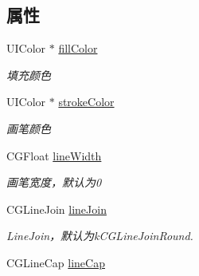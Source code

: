 \subsection*{属性}
\begin{DoxyCompactItemize}
\item 
\hypertarget{interface_b_m_k_overlay_path_view_a955c1cfe9de3338eccbde829a6651d07}{U\+I\+Color $\ast$ \hyperlink{interface_b_m_k_overlay_path_view_a955c1cfe9de3338eccbde829a6651d07}{fill\+Color}}\label{interface_b_m_k_overlay_path_view_a955c1cfe9de3338eccbde829a6651d07}

\begin{DoxyCompactList}\small\item\em 填充颜色 \end{DoxyCompactList}\item 
\hypertarget{interface_b_m_k_overlay_path_view_a5fe2c3236a16a520f9f867bd34dac08e}{U\+I\+Color $\ast$ \hyperlink{interface_b_m_k_overlay_path_view_a5fe2c3236a16a520f9f867bd34dac08e}{stroke\+Color}}\label{interface_b_m_k_overlay_path_view_a5fe2c3236a16a520f9f867bd34dac08e}

\begin{DoxyCompactList}\small\item\em 画笔颜色 \end{DoxyCompactList}\item 
\hypertarget{interface_b_m_k_overlay_path_view_a037ec8a5e6c8ee0f9b6459c8dbe280bb}{C\+G\+Float \hyperlink{interface_b_m_k_overlay_path_view_a037ec8a5e6c8ee0f9b6459c8dbe280bb}{line\+Width}}\label{interface_b_m_k_overlay_path_view_a037ec8a5e6c8ee0f9b6459c8dbe280bb}

\begin{DoxyCompactList}\small\item\em 画笔宽度，默认为0 \end{DoxyCompactList}\item 
\hypertarget{interface_b_m_k_overlay_path_view_aa57813af69de6d1852f47cdc198393fc}{C\+G\+Line\+Join \hyperlink{interface_b_m_k_overlay_path_view_aa57813af69de6d1852f47cdc198393fc}{line\+Join}}\label{interface_b_m_k_overlay_path_view_aa57813af69de6d1852f47cdc198393fc}

\begin{DoxyCompactList}\small\item\em Line\+Join，默认为k\+C\+G\+Line\+Join\+Round. \end{DoxyCompactList}\item 
\hypertarget{interface_b_m_k_overlay_path_view_a3b52405ce16992ffd75e98cf7f8392a1}{C\+G\+Line\+Cap \hyperlink{interface_b_m_k_overlay_path_view_a3b52405ce16992ffd75e98cf7f8392a1}{line\+Cap}}\label{interface_b_m_k_overlay_path_view_a3b52405ce16992ffd75e98cf7f8392a1}


\end{DoxyCompactItemize}
